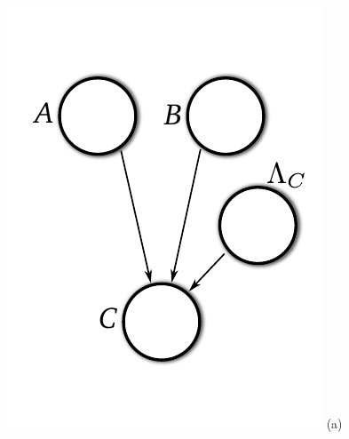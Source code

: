\documentclass{article}
\newcommand{\<}{\langle}
\renewcommand{\>}{\rangle}
\begin{document}
\begin{figure}
\centering
\begin{minipage}{0.4\textwidth}
\begin{center}
\includegraphics[width=\textwidth]{images/gm_true}
(a)
\end{center}
\end{minipage}
\begin{minipage}{0.4\textwidth}
\begin{center}

\end{center}
\end{minipage}
\end{figure}
\end{document}
